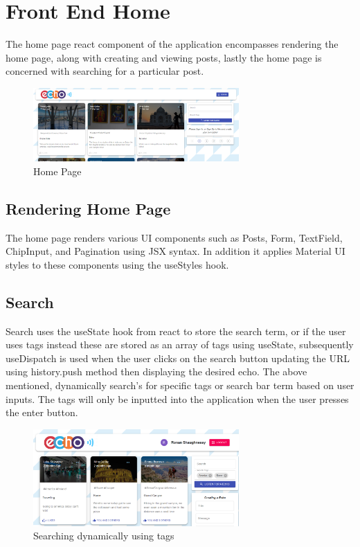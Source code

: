 \section{Front End Home}
The home page react component of the application encompasses rendering the home page, along with creating and viewing posts, lastly the home page is concerned with searching for a particular post.
\begin{figure}[h!]
    \centering
    \includegraphics[width=0.7\textwidth]{images/HomePage.png}
    \caption{Home Page}
    \label{image:HomePage}
\end{figure}

\subsection{Rendering Home Page}
The home page renders various UI components such as Posts, Form, TextField, ChipInput, and Pagination using JSX syntax.  In addition it applies Material UI styles to these components using the useStyles hook.
\subsection{Search}
Search uses the useState hook from react to store the search term, or if the user uses tags instead these are stored as an array of tags using useState, subsequently useDispatch is used when the user clicks on the search button updating the URL using history.push method then displaying the desired echo. The above mentioned, dynamically search's for specific tags or search bar term based on user inputs. The tags will only be inputted into the application when the user presses the enter button.
\begin{figure}[h!]
    \centering
    \includegraphics[width=0.7\textwidth]{images/SearchTags.png}
    \caption{Searching dynamically using tags}
    \label{image:SearchTags}
\end{figure}

